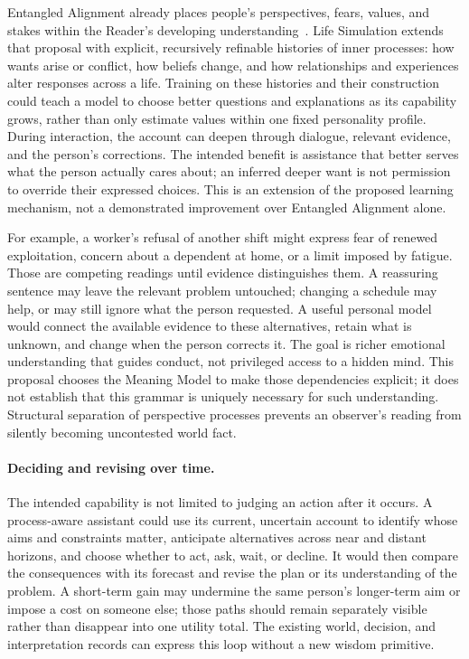 \documentclass[10pt]{article}
\begin{document}
Entangled Alignment already places people's perspectives, fears, values, and
stakes within the Reader's developing understanding~\cite{westerbergEntangled2026}.
Life Simulation extends that proposal with explicit, recursively refinable
histories of inner processes: how wants arise or conflict, how beliefs change,
and how relationships and experiences alter responses across a life. Training
on these histories and their construction could teach a model to choose better
questions and explanations as its capability grows, rather than only estimate
values within one fixed personality profile. During interaction, the account
can deepen through dialogue, relevant evidence, and the person's corrections.
The intended benefit is assistance that better serves what the person actually
cares about; an inferred deeper want is not permission to override their
expressed choices. This is an extension of the proposed learning mechanism,
not a demonstrated improvement over Entangled Alignment alone.

For example, a worker's refusal of another shift might express fear of renewed
exploitation, concern about a dependent at home, or a limit imposed by fatigue.
Those are competing readings until evidence distinguishes them. A reassuring
sentence may leave the relevant problem untouched; changing a schedule may
help, or may still ignore what the person requested. A useful personal model
would connect the available evidence to these alternatives, retain what is
unknown, and change when the person corrects it. The goal is richer emotional
understanding that guides conduct, not privileged access to a hidden mind.
This proposal chooses the Meaning Model to make those dependencies explicit;
it does not establish that this grammar is uniquely necessary for such
understanding. Structural separation of perspective processes prevents an
observer's reading from silently becoming uncontested world fact.

\paragraph{Deciding and revising over time.}
The intended capability is not limited to judging an action after it occurs.
A process-aware assistant could use its current, uncertain account to identify
whose aims and constraints matter, anticipate alternatives across near and
distant horizons, and choose whether to act, ask, wait, or decline. It would
then compare the consequences with its forecast and revise the plan or its
understanding of the problem. A short-term gain may undermine the same
person's longer-term aim or impose a cost on someone else; those paths should
remain separately visible rather than disappear into one utility total. The
existing world, decision, and interpretation records can express this loop
without a new wisdom primitive.
\end{document}
